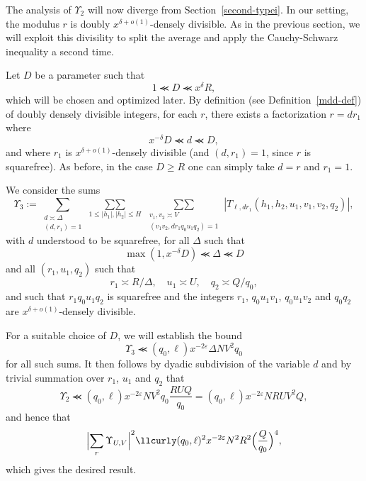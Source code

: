 \documentclass[12pt,a4paper,reqno]{amsart}
\numberwithin{equation}{section}
\theoremstyle{plain}
\theoremstyle{definition}
\newcommand\eps{\varepsilon}
\newcommand\sumsum{\mathop{\sum\sum}\limits}
\renewcommand{\sim}{\asymp}
\renewcommand{\lessapprox}{\llcurly}
\begin{document}
The analysis of $\Upsilon_2$ will now diverge from
Section~\ref{second-typei}. In our setting, the modulus $r$ is doubly
$x^{\delta+o(1)}$-densely divisible. As in the previous section, we
will exploit this divisility to split the average and apply the
Cauchy-Schwarz inequality a second time.
\par
Let $D$ be a parameter such that
\begin{equation}\label{dr}
  1 \lessapprox D \lessapprox x^{\delta}R,
\end{equation}
which will be chosen and optimized later. By definition (see
Definition~\ref{mdd-def}) of doubly densely divisible integers, for
each $r$, there exists a factorization $r=dr_1$ where
$$
x^{-\delta} D \lessapprox d \lessapprox D,
$$
and where $r_1$ is $x^{\delta+o(1)}$-densely divisible (and
$(d,r_1)=1$, since $r$ is squarefree).  As before, in the case $D \geq R$ one can simply take $d=r$ and $r_1=1$.
\par
We consider the sums
$$
\Upsilon_3:= \sum_{\substack{d\sim \Delta\\(d,r_1)=1}}
 \sumsum_{1\leq |h_1|,|h_2|\leq H}
\sumsum_{\substack{v_1,v_2\sim V\\(v_1v_2,dr_1q_0u_1q_2)=1}}
|T_{\ell,dr_1}(h_1,h_2,u_1,v_1,v_2,q_2)|,
$$
with $d$ understood to be squarefree,
for all  $\Delta$ such that
\begin{equation}\label{dbounds}
\max(1,x^{-\delta} D) \lessapprox \Delta \lessapprox D
\end{equation}
and all $(r_1,u_1,q_2)$ such that
\begin{equation}\label{rp}
r_1 \sim R/\Delta,\quad  u_1 \sim U,\quad q_2 \sim Q/q_0,
\end{equation}
and such that $r_1 q_0 u_1q_2$ is squarefree and the integers $r_1$,
$q_0u_1v_1$, $q_0u_1v_2$ and $q_0q_2$ are $x^{\delta+o(1)}$-densely
divisible.
\par
For a suitable choice of $D$, we will establish the bound
\begin{equation}\label{eq-upsilon-3}
  \Upsilon_3\lessapprox (q_0,\ell)x^{-2\eps}\Delta NV^2q_0
\end{equation}
for all such sums. It then follows by dyadic subdivision of the 
variable $d$ and by trivial summation over $r_1$, $u_1$ and $q_2$ that
$$
\Upsilon_2\lessapprox (q_0,\ell)x^{-2\eps}NV^2q_0
\frac{RUQ}{q_0}=(q_0,\ell)x^{-2\eps}NRUV^2Q,
$$
and hence that
$$
\Bigl|\sum_r\Upsilon_{U,V}\Bigr|^2\lessapprox
(q_0,\ell)^2x^{-2\eps} N^2R^2\Bigl(\frac{Q}{q_0}\Bigr)^4,
$$
which gives the desired result.
\par
\end{document}
